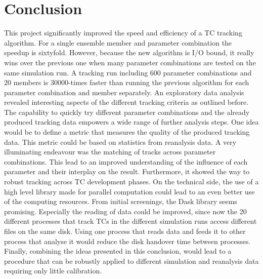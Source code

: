 \chapter{Conclusion}\label{sec:conclusion}
This project significantly improved the speed and efficiency of a TC tracking algorithm. For a single ensemble member and parameter combination the speedup is sixtyfold. However, because the new algorithm is I/O bound, it really wins over the previous one when many parameter combinations are tested on the same simulation run. A tracking run including 600 parameter combinations and 20 members is 30000-times faster than running the previous algorithm for each parameter combination and member separately. \newline
An exploratory data analysis revealed interesting aspects of the different tracking criteria as outlined before. The capability to quickly try different parameter combinations and the already produced tracking data empowers a wide range of further analysis steps. One idea would be to define a metric that measures the quality of the produced tracking data. This metric could be based on statistics from reanalysis data.\newline
A very illuminating endeavour was the matching of tracks across parameter combinations. This lead to an improved understanding of the influence of each parameter and their interplay on the result. Furthermore, it showed the way to robust tracking across TC development phases.\newline
On the technical side, the use of a high level library made for parallel computation could lead to an even better use of the computing resources. From initial screenings, the Dask library \cite{dask} seems promising. Especially the reading of data could be improved, since now the 20 different processes that track TCs in the different simulation runs access different files on the same disk. Using one process that reads data and feeds it to other process that analyse it would reduce the disk handover time between processes.\newline
Finally, combining the ideas presented in this conclusion, would lead to a procedure that can be robustly applied to different simulation and reanalysis data requiring only little calibration.
